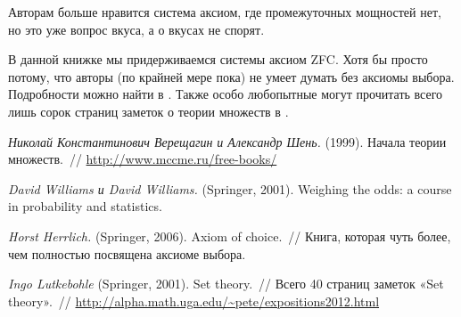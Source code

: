 \documentclass[12pt, a4paper]{article}
\begin{document}
\begin{center}
\end{center}

Авторам больше нравится система аксиом, где промежуточных мощностей нет, но это уже вопрос вкуса, а о вкусах не спорят.

В данной книжке мы придерживаемся системы аксиом ZFC. Хотя бы просто потому, что авторы (по крайней мере пока) не умеет думать без аксиомы выбора. Подробности можно найти в \cite{herrlich:axiom}. Также особо любопытные могут прочитать всего лишь сорок страниц заметок о теории множеств в \cite{Franclin:sets}.

\begin{thebibliography}{1}
    \emph{Николай Константинович Верещагин и Александр Шень.} (1999).
    Начала теории множеств.~//
    \url{http://www.mccme.ru/free-books/}
    
    \emph{David Williams и David Williams.} (Springer, 2001).
    Weighing the odds: a course in probability and statistics.

    \emph{Horst Herrlich.} (Springer, 2006).
    Axiom of choice.~//
    Книга, которая чуть более, чем полностью посвящена аксиоме выбора.
     
    \emph{Ingo Lutkebohle} (Springer, 2001).
    Set theory.~//
    Всего 40 страниц заметок «Set theory».~// \url{http://alpha.math.uga.edu/~pete/expositions2012.html}
\end{thebibliography}
\end{document}
